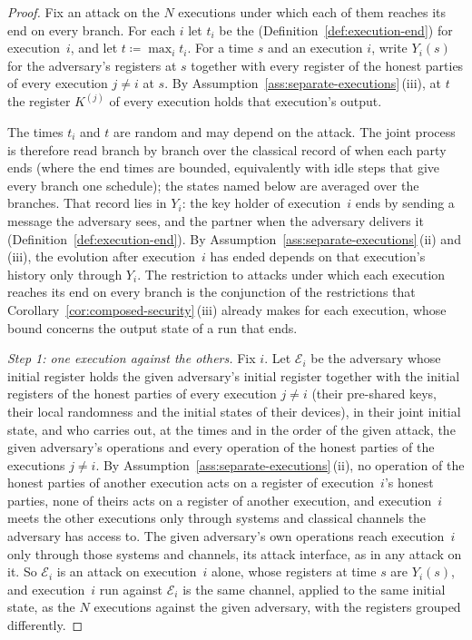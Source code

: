 \begin{proof}
Fix an attack on the $N$ executions under which each of them reaches its
end on every branch. For each $i$ let $t_i$ be the
 (Definition~\ref{def:execution-end}) for
execution~$i$, and let
$t\coloneqq\max_i t_i$. For a time $s$ and an execution $i$, write
$Y_i(s)$ for the adversary's registers at $s$ together with every register
of the honest parties of every execution $j\ne i$ at $s$. By
Assumption~\ref{ass:separate-executions}\,(iii), at $t$ the register
$K^{(j)}$ of every execution holds that execution's output.

The times $t_i$ and $t$ are random and may depend on the attack. The joint
process is therefore read branch by branch over the classical record of
when each party ends (where the end times are bounded, equivalently with
idle steps that give every branch one schedule); the states named below
are averaged over the branches. That record lies in $Y_i$: the key holder of execution~$i$ ends
by sending a message the adversary sees, and the partner when the
adversary delivers it (Definition~\ref{def:execution-end}). By
Assumption~\ref{ass:separate-executions}\,(ii) and (iii), the evolution
after execution~$i$ has ended depends on that execution's history only
through $Y_i$. The restriction to attacks under which each execution
reaches its end on every branch is the conjunction of the restrictions
that Corollary~\ref{cor:composed-security}\,(iii) already makes for each
execution, whose bound concerns the output state of a run that ends.

\emph{Step 1: one execution against the others.} Fix $i$. Let
$\mathcal E_i$ be the adversary whose initial register holds the given
adversary's initial register together with the initial registers of the
honest parties of every execution $j\ne i$ (their pre-shared keys, their
local randomness and the initial states of their devices), in their joint
initial state, and who carries out, at the times and in the order of the
given attack, the given adversary's operations and every operation of the
honest parties of the executions $j\ne i$. By
Assumption~\ref{ass:separate-executions}\,(ii), no operation of the honest
parties of another execution acts on a register of execution~$i$'s honest
parties, none of theirs acts on a register of another execution, and
execution~$i$ meets the other executions only through systems and
classical channels the adversary has access to. The given adversary's own
operations reach execution~$i$ only through those systems and channels,
its attack interface, as in any attack on it. So
$\mathcal E_i$ is an attack on execution~$i$ alone, whose registers at time
$s$ are $Y_i(s)$, and execution~$i$ run against $\mathcal E_i$ is the same
channel, applied to the same initial state, as the $N$ executions against
the given adversary, with the registers grouped differently.


\end{proof}
